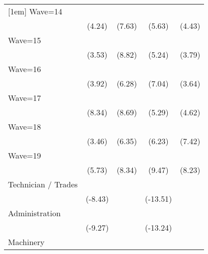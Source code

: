 {\begin{tabular}{l*{4}{c}}
[1em]
Wave=14             &            \sym{***}&            \sym{***}&            \sym{***}&            \sym{***}\\
                    &      (4.24)         &      (7.63)         &      (5.63)         &      (4.43)         \\
[1em]
Wave=15             &            \sym{***}&            \sym{***}&            \sym{***}&            \sym{***}\\
                    &      (3.53)         &      (8.82)         &      (5.24)         &      (3.79)         \\
[1em]
Wave=16             &            \sym{***}&            \sym{***}&            \sym{***}&            \sym{***}\\
                    &      (3.92)         &      (6.28)         &      (7.04)         &      (3.64)         \\
[1em]
Wave=17             &            \sym{***}&            \sym{***}&            \sym{***}&            \sym{***}\\
                    &      (8.34)         &      (8.69)         &      (5.29)         &      (4.62)         \\
[1em]
Wave=18             &            \sym{***}&            \sym{***}&            \sym{***}&            \sym{***}\\
                    &      (3.46)         &      (6.35)         &      (6.23)         &      (7.42)         \\
[1em]
Wave=19             &            \sym{***}&            \sym{***}&            \sym{***}&            \sym{***}\\
                    &      (5.73)         &      (8.34)         &      (9.47)         &      (8.23)         \\
[1em]
Technician / Trades &            \sym{***}&                     &            \sym{***}&                     \\
                    &     (-8.43)         &                     &    (-13.51)         &                     \\
[1em]
Administration      &            \sym{***}&                     &            \sym{***}&                     \\
                    &     (-9.27)         &                     &    (-13.24)         &                     \\
[1em]
Machinery           &            \sym{***}&                     &            \sym{***}&                     \\

\end{tabular}}

